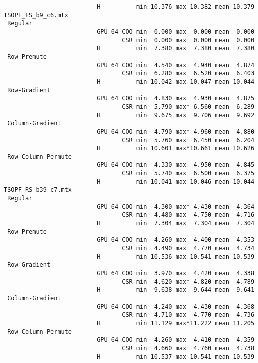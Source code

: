 {\begin{verbatim}
                          H          min 10.376 max 10.382 mean 10.379
TSOPF_FS_b9_c6.mtx
 Regular
                          GPU 64 COO min  0.000 max  0.000 mean  0.000
                                 CSR min  0.000 max  0.000 mean  0.000
                          H          min  7.380 max  7.380 mean  7.380
 Row-Premute
                          GPU 64 COO min  4.540 max  4.940 mean  4.874
                                 CSR min  6.280 max  6.520 mean  6.403
                          H          min 10.042 max 10.047 mean 10.044
 Row-Gradient
                          GPU 64 COO min  4.830 max  4.930 mean  4.875
                                 CSR min  5.790 max* 6.560 mean  6.289
                          H          min  9.675 max  9.706 mean  9.692
 Column-Gradient
                          GPU 64 COO min  4.790 max* 4.960 mean  4.880
                                 CSR min  5.760 max  6.450 mean  6.204
                          H          min 10.601 max*10.661 mean 10.626
 Row-Column-Permute
                          GPU 64 COO min  4.330 max  4.950 mean  4.845
                                 CSR min  5.740 max  6.500 mean  6.375
                          H          min 10.041 max 10.046 mean 10.044
TSOPF_RS_b39_c7.mtx
 Regular
                          GPU 64 COO min  4.300 max* 4.430 mean  4.364
                                 CSR min  4.480 max  4.750 mean  4.716
                          H          min  7.304 max  7.304 mean  7.304
 Row-Premute
                          GPU 64 COO min  4.260 max  4.400 mean  4.353
                                 CSR min  4.490 max  4.770 mean  4.734
                          H          min 10.536 max 10.541 mean 10.539
 Row-Gradient
                          GPU 64 COO min  3.970 max  4.420 mean  4.338
                                 CSR min  4.620 max* 4.820 mean  4.789
                          H          min  9.638 max  9.644 mean  9.641
 Column-Gradient
                          GPU 64 COO min  4.240 max  4.430 mean  4.368
                                 CSR min  4.710 max  4.770 mean  4.736
                          H          min 11.129 max*11.222 mean 11.205
 Row-Column-Permute
                          GPU 64 COO min  4.260 max  4.410 mean  4.359
                                 CSR min  4.660 max  4.760 mean  4.738
                          H          min 10.537 max 10.541 mean 10.539
\end{verbatim}
}
